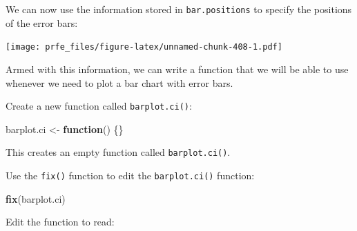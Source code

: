 \documentclass[12pt,a4paper]{book}
\newenvironment{Shaded}{\begin{snugshade}}{\end{snugshade}}
\newcommand{\KeywordTok}[1]{\textcolor[rgb]{0.13,0.29,0.53}{\textbf{#1}}}
\newcommand{\DataTypeTok}[1]{\textcolor[rgb]{0.13,0.29,0.53}{#1}}
\newcommand{\DecValTok}[1]{\textcolor[rgb]{0.00,0.00,0.81}{#1}}
\newcommand{\FloatTok}[1]{\textcolor[rgb]{0.00,0.00,0.81}{#1}}
\newcommand{\StringTok}[1]{\textcolor[rgb]{0.31,0.60,0.02}{#1}}
\newcommand{\ControlFlowTok}[1]{\textcolor[rgb]{0.13,0.29,0.53}{\textbf{#1}}}
\newcommand{\OperatorTok}[1]{\textcolor[rgb]{0.81,0.36,0.00}{\textbf{#1}}}
\newcommand{\NormalTok}[1]{#1}
\theoremstyle{definition}
\theoremstyle{definition}
\theoremstyle{definition}
\theoremstyle{remark}
\begin{document}
We can now use the information stored in \texttt{bar.positions} to
specify the positions of the error bars:

\begin{Shaded}
\end{Shaded}

\texttt{[image: prfe\_files/figure-latex/unnamed-chunk-408-1.pdf]}

Armed with this information, we can write a function that we will be
able to use whenever we need to plot a bar chart with error bars.

Create a new function called \texttt{barplot.ci()}:

\begin{Shaded}
\begin{Highlighting}[]
\NormalTok{barplot.ci <-}\StringTok{ }\ControlFlowTok{function}\NormalTok{() \{\}}
\end{Highlighting}
\end{Shaded}

This creates an empty function called \texttt{barplot.ci()}.

Use the \texttt{fix()} function to edit the \texttt{barplot.ci()}
function:

\begin{Shaded}
\begin{Highlighting}[]
\KeywordTok{fix}\NormalTok{(barplot.ci)}
\end{Highlighting}
\end{Shaded}

Edit the function to read:
\end{document}
